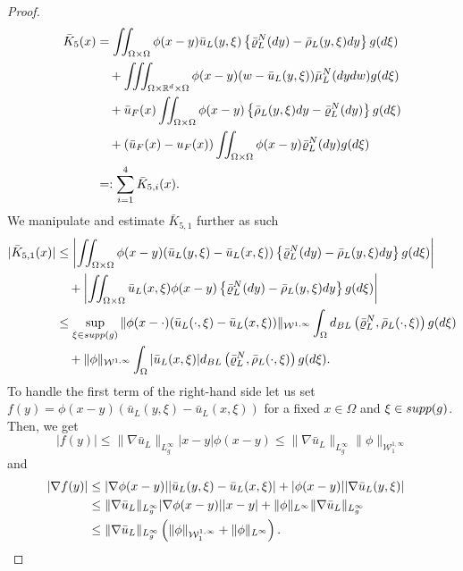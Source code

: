 \documentclass[10pt,a4paper]{amsart}
\newcommand{\R}{\mathbb{R}}
\newcommand{\calW}{\mathcal W}
\newcommand{\dw}{\textnormal{d}w}
\newcommand{\dxi}{\textnormal{d}\xi}
\newcommand{\dy}{\textnormal{d}y}
\begin{document}
\begin{proof}
    \begin{align*}
        \bar K_5(x)         &= \iint_{\Omega \times \Omega}\phi(x-y) \bar u_L(y,\xi) \left\{\bar\varrho^N_L(\dy) - \bar \rho_L(y,\xi)\dy \right\} g(\dxi) \\
        &\quad + \iiint_{\Omega\times\R^d\times\Omega} \phi(x-y) (w- \bar u_L(y,\xi)) \bar\mu_L^N(\dy\dw)g(\dxi) \\
        &\quad + \bar u_F(x) \iint_{\Omega \times \Omega} \phi(x-y)\left\{\bar \rho_L(y,\xi)\dy - \bar\varrho^N_L(\dy) \right\}g(\dxi) \\
        &\quad + (\bar u_F(x) - u_F(x))\iint_{\Omega \times \Omega} \phi(x-y) \bar\varrho^N_L(\dy) g(\dxi) \\
        &=: \sum_{i=1}^4 \bar K_{5,i}(x).
    \end{align*}
     We manipulate and estimate $\bar K_{5,1}$ further as such
 \begin{align*}
        |\bar K_{5,1}(x)| &\le \left|\iint_{\Omega \times \Omega} \phi(x-y) (\bar u_L(y,\xi) - \bar u_L(x,\xi)) \left\{\bar\varrho^N_L(\dy) - \bar \rho_L(y,\xi)\dy \right\} g(\dxi)\right|  \\
        &\quad + \left| \iint_{\Omega \times \Omega} \bar u_L(x,\xi) \phi(x-y) \left\{\bar\varrho^N_L(\dy) - \bar \rho_L(y,\xi)\dy \right\} g(\dxi) \right| \\
        &\le \sup_{\xi\in\textnormal{supp}(g)} \|\phi(x-\cdot)(\bar u_L(\cdot,\xi)-\bar u_L(x,\xi))\|_{\calW^{1,\infty}} \int_{\Omega} d_{\rm BL}\left(\bar\varrho^N_L, \bar \rho_L(\cdot,\xi) \right) g(\dxi) \\
        &\quad + \|\phi\|_{\calW^{1,\infty}} \int_{\Omega} |\bar u_L(x,\xi)| d_{\rm BL}\left(\bar\varrho^N_L, \bar \rho_L(\cdot,\xi)\right) g(\dxi).
    \end{align*}
    To handle the first term of the right-hand side let us set $f(y) = \phi(x-y)(\bar u_L(y,\xi)-\bar u_L(x,\xi))$ for a fixed $x \in \Omega$ and $\xi \in {\rm supp}(g)$. Then, we get
    \[
    |f(y)| \leq \|\nabla \bar u_L\|_{L^\infty_g} |x-y|\phi(x-y) \leq \|\nabla \bar u_L\|_{L^\infty_g}   \|\phi\|_{\calW^{1,\infty}_1}
    \]
    and
    \begin{align*}
    |\nabla f(y)| &\le |\nabla \phi(x-y)| |\bar u_L(y,\xi)-\bar u_L(x,\xi)| + |\phi(x-y)| |\nabla \bar u_L(y,\xi)|\cr
    &\leq \|\nabla \bar u_L\|_{L^\infty_g}|\nabla \phi(x-y)| |x-y| + \|\phi\|_{L^\infty} \|\nabla \bar u_L\|_{L^\infty_g} \cr
    &\leq \|\nabla \bar u_L\|_{L^\infty_g} \left(\| \phi \|_{\calW^{1,\infty}_1 } + \|\phi\|_{L^\infty} \right).

\end{align*}
\end{proof}
\end{document}
